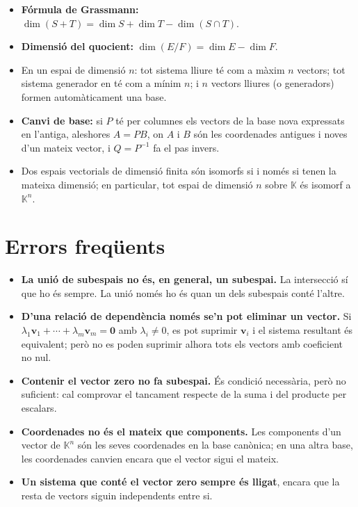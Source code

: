 \begin{itemize}
\item \textbf{Fórmula de Grassmann:}
$\dim (S+T)=\dim S+\dim T-\dim (S\cap T)$.
\item \textbf{Dimensió del quocient:} $\dim (E/F)=\dim E-\dim F$.
\item En un espai de dimensió $n$: tot sistema lliure té com a màxim $n$ vectors; tot sistema generador en té com a mínim $n$; i $n$ vectors lliures (o generadors) formen automàticament una base.
\item \textbf{Canvi de base:} si $P$ té per columnes els vectors de la base nova expressats en l'antiga, aleshores $A=PB$, on $A$ i $B$ són les coordenades antigues i noves d'un mateix vector, i $Q=P^{-1}$ fa el pas invers.
\item Dos espais vectorials de dimensió finita són isomorfs si i només si tenen la mateixa dimensió; en particular, tot espai de dimensió $n$ sobre $\mathbb{K}$ és isomorf a $\mathbb{K}^{n}$.
\end{itemize}

\section{Errors freqüents}

\begin{itemize}
\item \textbf{La unió de subespais no és, en general, un subespai.} La intersecció sí que ho és sempre. La unió només ho és quan un dels subespais conté l'altre.
\item \textbf{D'una relació de dependència només se'n pot eliminar un vector.} Si $\lambda _{1}\mathbf{v}_{1}+\cdots +\lambda _{m}\mathbf{v}_{m}=\mathbf{0}$ amb $\lambda _{i}\neq 0$, es pot suprimir $\mathbf{v}_{i}$ i el sistema resultant és equivalent; però no es poden suprimir alhora tots els vectors amb coeficient no nul.
\item \textbf{Contenir el vector zero no fa subespai.} És condició necessària, però no suficient: cal comprovar el tancament respecte de la suma i del producte per escalars.
\item \textbf{Coordenades no és el mateix que components.} Les components d'un vector de $\mathbb{K}^{n}$ són les seves coordenades en la base canònica; en una altra base, les coordenades canvien encara que el vector sigui el mateix.
\item \textbf{Un sistema que conté el vector zero sempre és lligat}, encara que la resta de vectors siguin independents entre si.
\end{itemize} 